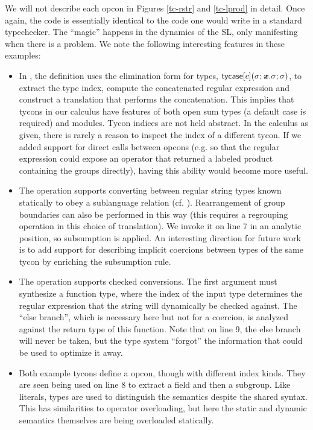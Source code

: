 \documentclass[9pt,preprint]{sigplanconf}
\begin{document}
We will not describe each opcon in Figures \ref{tc-rstr} and \ref{tc-lprod} in detail. Once again, the code is essentially identical to the code one would write in a standard typechecker. The ``magic'' happens in the dynamics of the SL, only manifesting when there is a problem. We note the following interesting features in these examples:
\begin{itemize}
\item In , the definition uses the elimination form for types, ${\sf tycase}[c](\sigma; {\textbf{\textit{x}}}.\sigma; \sigma)$, to extract the type index, compute the concatenated regular expression and construct a translation that performs the concatenation. This implies that tycons in our calculus have features of both open sum types (a default case is required) and modules. Tycon indices are not held abstract. In the calculus as given, there is rarely a reason to inspect the index of a different tycon. If we added support for direct calls between opcons (e.g. so that the regular expression could expose an operator that returned a labeled product containing the groups directly), having this ability would become more useful.
\item The  operation supports converting between regular string types known statically to obey a sublanguage relation (cf. \cite{conf/cpp/DoczkalKS13}). Rearrangement of group boundaries can also be performed in this way (this requires a regrouping operation in this choice of translation). We invoke it on line 7 in an analytic position, so subsumption is applied. An interesting direction for future work is to add support for describing implicit coercions between types of the same tycon by enriching the subsumption rule.
\item The  operation supports checked conversions. The first argument must synthesize a function type, where the index of the input type determines the regular expression that the string will dynamically be checked against. The ``else branch'', which is necessary here but not for a coercion, is analyzed against the return type of this function. Note that on line 9, the else branch will never be taken, but the type system ``forgot'' the information that could be used to optimize it away.
\item Both example tycons define a \opname{\#} opcon, though with different index kinds. They are seen being used on line 8 to extract a field and then a subgroup. Like literals, types are used to distinguish the semantics despite the shared syntax. This has similarities to operator overloading, but here the static and dynamic semantics themselves are being overloaded statically. %

\end{itemize}
\end{document}

